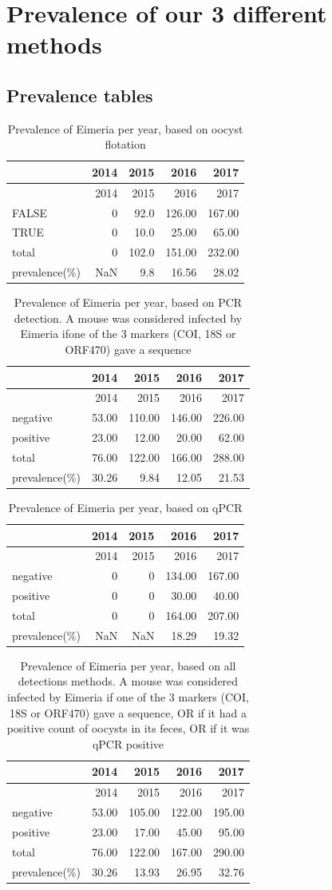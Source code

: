 \documentclass[]{article}
\begin{document}
\section{Prevalence of our 3 different
methods}\label{prevalence-of-our-3-different-methods}

\subsection{Prevalence tables}\label{prevalence-tables}

\begin{longtable}[]{@{}lrrrr@{}}
\caption{Prevalence of Eimeria per year, based on oocyst
flotation}\tabularnewline
\toprule
& 2014 & 2015 & 2016 & 2017\tabularnewline
\midrule
\endfirsthead
\toprule
& 2014 & 2015 & 2016 & 2017\tabularnewline
\midrule
\endhead
FALSE & 0 & 92.0 & 126.00 & 167.00\tabularnewline
TRUE & 0 & 10.0 & 25.00 & 65.00\tabularnewline
total & 0 & 102.0 & 151.00 & 232.00\tabularnewline
prevalence(\%) & NaN & 9.8 & 16.56 & 28.02\tabularnewline
\bottomrule
\end{longtable}

\begin{longtable}[]{@{}lrrrr@{}}
\caption{Prevalence of Eimeria per year, based on PCR detection. A mouse
was considered infected by Eimeria ifone of the 3 markers (COI, 18S or
ORF470) gave a sequence}\tabularnewline
\toprule
& 2014 & 2015 & 2016 & 2017\tabularnewline
\midrule
\endfirsthead
\toprule
& 2014 & 2015 & 2016 & 2017\tabularnewline
\midrule
\endhead
negative & 53.00 & 110.00 & 146.00 & 226.00\tabularnewline
positive & 23.00 & 12.00 & 20.00 & 62.00\tabularnewline
total & 76.00 & 122.00 & 166.00 & 288.00\tabularnewline
prevalence(\%) & 30.26 & 9.84 & 12.05 & 21.53\tabularnewline
\bottomrule
\end{longtable}

\begin{longtable}[]{@{}lrrrr@{}}
\caption{Prevalence of Eimeria per year, based on qPCR}\tabularnewline
\toprule
& 2014 & 2015 & 2016 & 2017\tabularnewline
\midrule
\endfirsthead
\toprule
& 2014 & 2015 & 2016 & 2017\tabularnewline
\midrule
\endhead
negative & 0 & 0 & 134.00 & 167.00\tabularnewline
positive & 0 & 0 & 30.00 & 40.00\tabularnewline
total & 0 & 0 & 164.00 & 207.00\tabularnewline
prevalence(\%) & NaN & NaN & 18.29 & 19.32\tabularnewline
\bottomrule
\end{longtable}

\begin{longtable}[]{@{}lrrrr@{}}
\caption{Prevalence of Eimeria per year, based on all detections
methods. A mouse was considered infected by Eimeria if one of the 3
markers (COI, 18S or ORF470) gave a sequence, OR if it had a positive
count of oocysts in its feces, OR if it was qPCR
positive}\tabularnewline
\toprule
& 2014 & 2015 & 2016 & 2017\tabularnewline
\midrule
\endfirsthead
\toprule
& 2014 & 2015 & 2016 & 2017\tabularnewline
\midrule
\endhead
negative & 53.00 & 105.00 & 122.00 & 195.00\tabularnewline
positive & 23.00 & 17.00 & 45.00 & 95.00\tabularnewline
total & 76.00 & 122.00 & 167.00 & 290.00\tabularnewline
prevalence(\%) & 30.26 & 13.93 & 26.95 & 32.76\tabularnewline
\bottomrule
\end{longtable}
\end{document}
